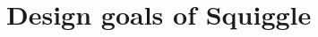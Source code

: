 \documentclass[../main.tex]{subfiles}
\begin{document}
\section{Design goals of Squiggle}
\end{document}
